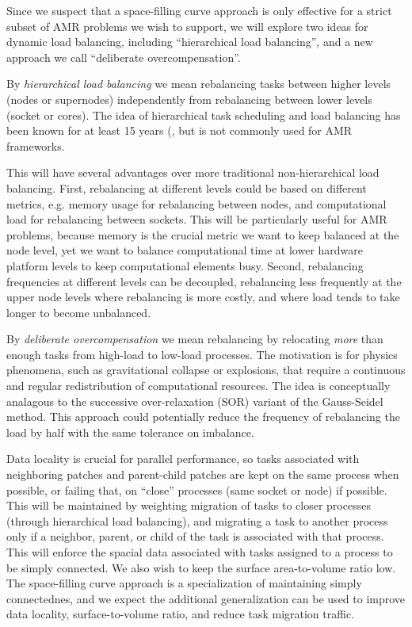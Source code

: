\documentclass[10pt]{article}
\begin{document}
Since we suspect that a space-filling curve approach is only effective
for a strict subset of AMR problems we wish to support, we will
explore two ideas for dynamic load balancing, including ``hierarchical
load balancing'', and a new approach we call ``deliberate
overcompensation''.

%
By \textit{hierarchical load balancing} we mean rebalancing tasks
between higher levels (nodes or supernodes) independently from
rebalancing between lower levels (socket or cores).  The idea of
hierarchical task scheduling and load balancing has been known for at
least 15 years (\cite{AhGh94}, but is not commonly used for AMR
frameworks.

This will have several advantages over more traditional
non-hierarchical load balancing.  First, rebalancing at different
levels could be based on different metrics, e.g. memory usage for
rebalancing between nodes, and computational load for rebalancing
between sockets.  This will be particularly useful for AMR problems,
because memory is the crucial metric we want to keep balanced at the
node level, yet we want to balance computational time at lower
hardware platform levels to keep computational elements busy.  Second,
rebalancing frequencies at different levels can be decoupled,
rebalancing less frequently at the upper node levels where rebalancing
is more costly, and where load tends to take longer to become
unbalanced.

%
By \textit{deliberate overcompensation} we mean rebalancing by
relocating \textit{more} than enough tasks from high-load to low-load
processes.  The motivation is for physics phenomena, such as
gravitational collapse or explosions, that require a continuous and
regular redistribution of computational resources.  The idea is
conceptually analagous to the successive over-relaxation (SOR) variant
of the Gauss-Seidel method.  This approach could potentially reduce
the frequency of rebalancing the load by half with the same tolerance
on imbalance.

%
Data locality is crucial for parallel performance, so tasks associated
with neighboring patches and parent-child patches are kept on the same
process when possible, or failing that, on ``close'' processes (same
socket or node) if possible.  This will be maintained by weighting
migration of tasks to closer processes (through hierarchical load
balancing), and migrating a task to another process only if a
neighbor, parent, or child of the task is associated with that
process.  This will enforce the spacial data associated with tasks
assigned to a process to be simply connected.  We also wish to keep
the surface area-to-volume ratio low.  The space-filling curve
approach is a specialization of maintaining simply connectednes, and
we expect the additional generalization can be used to improve data
locality, surface-to-volume ratio, and reduce task migration traffic.
\end{document}
